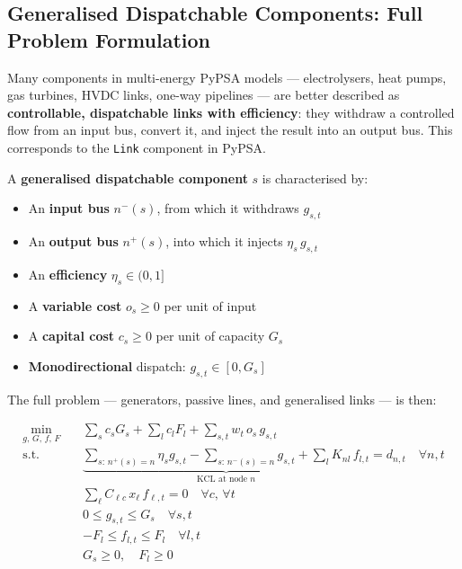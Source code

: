\documentclass{article}
\begin{document}
\subsection{Generalised Dispatchable Components: Full Problem Formulation}
\label{sec:generalised}

Many components in multi-energy PyPSA models --- electrolysers, heat pumps,
gas turbines, HVDC links, one-way pipelines --- are better described as
\textbf{controllable, dispatchable links with efficiency}: they withdraw a
controlled flow from an input bus, convert it, and inject the result into an
output bus. This corresponds to the \texttt{Link} component in PyPSA.

A \textbf{generalised dispatchable component} $s$ is characterised by:
\begin{itemize}
    \item An \textbf{input bus} $n^-(s)$, from which it withdraws $g_{s,t}$
    \item An \textbf{output bus} $n^+(s)$, into which it injects $\eta_s\, g_{s,t}$
    \item An \textbf{efficiency} $\eta_s \in (0,1]$
    \item A \textbf{variable cost} $o_s \ge 0$ per unit of input
    \item A \textbf{capital cost} $c_s \ge 0$ per unit of capacity $G_s$
    \item \textbf{Monodirectional} dispatch: $g_{s,t} \in [0, G_s]$
\end{itemize}

The full problem --- generators, passive lines, and generalised links ---
is then:

\begin{align}
\min_{g,\, G,\, f,\, F} \quad
    & \sum_{s} c_s G_s + \sum_{l} c_l F_l
      + \sum_{s,t} w_t \, o_s \, g_{s,t} \tag{P} \label{eq:full_obj} \\
\text{s.t.} \quad
    & \underbrace{\sum_{s:\, n^+(s)=n} \eta_s g_{s,t}
      - \sum_{s:\, n^-(s)=n} g_{s,t}
      + \sum_{l} K_{nl}\, f_{l,t}}_{\text{KCL at node }n}
      = d_{n,t}
      \quad \forall n,t
      \tag{KCL} \label{eq:full_kcl} \\
    & \sum_{\ell} C_{\ell c}\, x_\ell\, f_{\ell,t} = 0
      \quad \forall c,\, \forall t
      \tag{KVL} \label{eq:full_kvl} \\
    & 0 \le g_{s,t} \le G_s \quad \forall s,t
      \tag{D} \label{eq:full_disp} \\
    & -F_l \le f_{l,t} \le F_l \quad \forall l,t
      \tag{FL} \label{eq:full_flow} \\
    & G_s \ge 0,\quad F_l \ge 0
\end{align}
\end{document}
